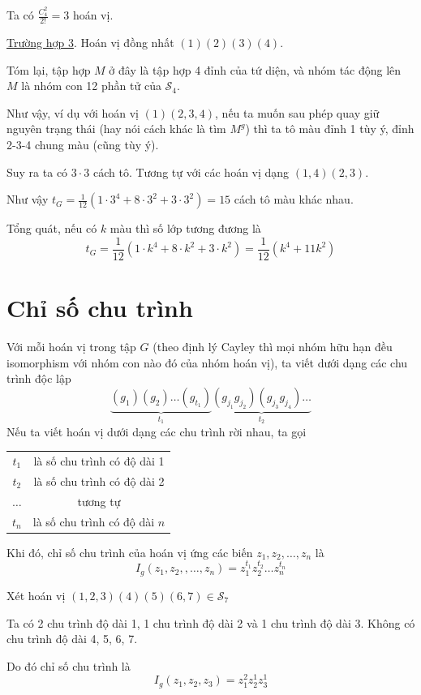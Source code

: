 \begin{example}
    Ta có $\frac{C^2_4}{2!} = 3$ hoán vị.

    \underline{Trường hợp 3}. Hoán vị đồng nhất $(1)(2)(3)(4)$.

    Tóm lại, tập hợp $M$ ở đây là tập hợp 4 đỉnh của tứ diện, và nhóm tác động lên $M$ là nhóm con 12 phần tử của $\mathcal{S}_4$.

    Như vậy, ví dụ với hoán vị $(1)(2,3,4)$, nếu ta muốn sau phép quay giữ nguyên trạng thái (hay nói cách khác là tìm $M^g$) thì ta
    tô màu đỉnh 1 tùy ý, đỉnh 2-3-4 chung màu (cũng tùy ý).

    Suy ra ta có $3 \cdot 3$ cách tô. Tương tự với các hoán vị dạng $(1,4)(2,3)$.

    Như vậy $t_G = \frac{1}{12}(1 \cdot 3^4 + 8 \cdot 3^2 + 3 \cdot 3^2) = 15$ cách tô màu khác nhau.
\end{example}

Tổng quát, nếu có $k$ màu thì số lớp tương đương là
\[t_G = \frac{1}{12}(1 \cdot k^4 + 8 \cdot k^2 + 3 \cdot k^2) = \frac{1}{12}(k^4 + 11 k^2)\]

\section{Chỉ số chu trình}

Với mỗi hoán vị trong tập $G$ (theo định lý Cayley thì mọi nhóm hữu hạn đều isomorphism với nhóm con nào đó của nhóm hoán vị), ta viết dưới dạng các chu trình độc lập
\[\underbrace{(g_1) (g_2) \ldots (g_{t_{1}})}_{t_1} \underbrace{(g_{j_1} g_{j_2}) (g_{j_3} g_{j_4})\ldots}_{t_2}\]
Nếu ta viết hoán vị dưới dạng các chu trình rời nhau, ta gọi

\begin{tabular}{c c}
    $t_1$ & là số chu trình có độ dài 1 \\
    $t_2$ & là số chu trình có độ dài 2 \\
    $\ldots$ & tương tự \\
    $t_n$ & là số chu trình có độ dài $n$
\end{tabular}

Khi đó, chỉ số chu trình của hoán vị ứng các biến $z_1, z_2, \ldots, z_n$ là
\[I_g (z_1, z_2, ,\ldots, z_n) = z_1^{t_1} z_2^{t_2} \ldots z_n^{t_n}\]

\begin{example}
Xét hoán vị $(1,2,3)(4)(5)(6,7) \in \mathcal{S}_7$

Ta có 2 chu trình độ dài 1, 1 chu trình độ dài 2 và 1 chu trình độ dài 3.
Không có chu trình độ dài 4, 5, 6, 7.

Do đó chỉ số chu trình là 
\[I_g (z_1, z_2, z_3) = z_1^2 z_2^1 z_3^1\]

\end{example}

